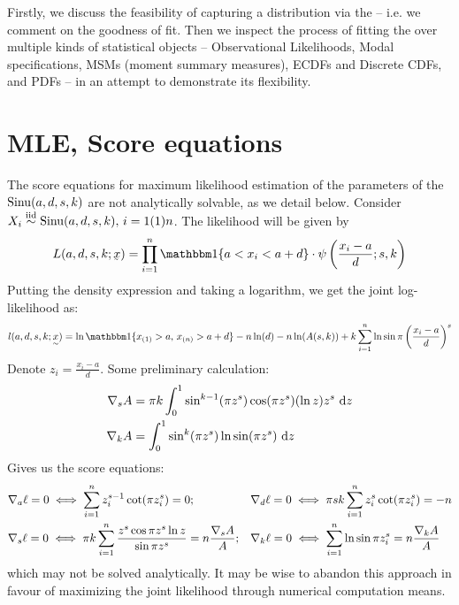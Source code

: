 Firstly, we discuss the feasibility of capturing a distribution via the \sindist{} -- i.e. we comment on the goodness of fit. Then we inspect the process of fitting the \sindist{} over multiple kinds of statistical objects -- Observational Likelihoods, Modal specifications, MSMs (moment summary measures), ECDFs and Discrete CDFs, and PDFs -- in an attempt to demonstrate its flexibility.


\section{MLE, Score equations}
The score equations for maximum likelihood estimation of the parameters of the \sindist{} $\operatorname*{Sinu}(a,d,s,k)$ are not analytically solvable, as we detail below. Consider $X_i \overset{\text{iid}}{\sim} \operatorname*{Sinu}(a,d,s,k), \, i=1(1)n$. The likelihood will be given by 
\[L(a,d,s,k; \vector x) = \prod_{i=1}^n \indicator\set{a < x_i < a+d} \cdot \psi\left(\frac{x_i -a}{d}; s,k\right)\]
Putting the density expression and taking a logarithm, we get the joint log-likelihood as:
\begin{equation*}
    l(a,d,s,k; \utilde x)
    = \ln \indicator \set{x_{(1)}>a, \, x_{(n)}>a+d} -n\ln(d)-n\ln(A(s,k)) + k\sum_{i=1}^n \ln \sin \pi\left( x_i-a \over d \right)^s
\end{equation*}
Denote $z_i = \frac{x_i -a}{d}$. Some preliminary calculation:
\begin{align*}
    \nabla_s A &= \pi k \int_0^1 \sin^{k-1}(\pi z^s) \cos(\pi z^s) (\ln z) z^s \ \mathrm d z\\
    \nabla_k A &= \int_0^1 \sin^k(\pi z^s) \ln \sin(\pi z^s) \ \mathrm d z
\end{align*}
Gives us the score equations:
\begin{align*}
    &\nabla_a \ell = 0 \iff \sum_{i=1}^n z_i^{s-1} \cot(\pi z_i^s) = 0;  && \nabla_d \ell = 0 \iff \pi sk \sum_{i=1}^n z_i^s \cot(\pi z_i^s) = -n \\
    &\nabla_s \ell = 0 \iff  \pi k \sum_{i=1}^n {z^s \cos \pi z^s \ln z  \over \sin \pi z^s} = n {\nabla_s A \over A};  &&  \nabla_k \ell = 0 \iff \sum_{i=1}^n \ln \sin \pi z_i^s = n{\nabla_k A \over A}
\end{align*}
which may not be solved analytically. It may be wise to abandon this approach in favour of maximizing the joint likelihood through numerical computation means.


